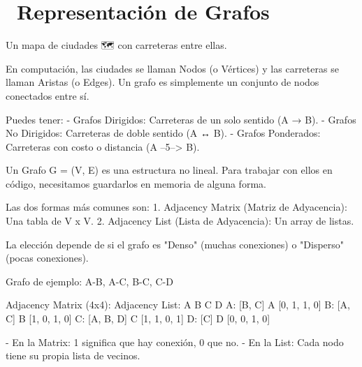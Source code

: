 ﻿\chapter[\emj{🗺️}~Representación de Grafos]{~Representación de Grafos}

\begin{dsaquees}

Un mapa de ciudades 🗺️ con carreteras entre ellas. 

En computación, las ciudades se llaman Nodos (o Vértices) y las 
carreteras se llaman Aristas (o Edges). Un grafo es simplemente un 
conjunto de nodos conectados entre sí. 

Puedes tener:
- Grafos Dirigidos: Carreteras de un solo sentido (A → B).
- Grafos No Dirigidos: Carreteras de doble sentido (A ↔ B).
- Grafos Ponderados: Carreteras con costo o distancia (A --5--> B).

\end{dsaquees}

\begin{dsaotraforma}

Un Grafo G = (V, E) es una estructura no lineal. Para trabajar con 
ellos en código, necesitamos guardarlos en memoria de alguna forma. 

Las dos formas más comunes son:
1. Adjacency Matrix (Matriz de Adyacencia): Una tabla de V x V.
2. Adjacency List (Lista de Adyacencia): Un array de listas.

La elección depende de si el grafo es "Denso" (muchas conexiones) o 
"Disperso" (pocas conexiones).

\end{dsaotraforma}

\begin{dsadiagrama}
Grafo de ejemplo: A-B, A-C, B-C, C-D

Adjacency Matrix (4x4):      Adjacency List:
     A  B  C  D              A: [B, C]
  A [0, 1, 1, 0]             B: [A, C]
  B [1, 0, 1, 0]             C: [A, B, D]
  C [1, 1, 0, 1]             D: [C]
  D [0, 0, 1, 0]

- En la Matrix: 1 significa que hay conexión, 0 que no.
- En la List: Cada nodo tiene su propia lista de vecinos.
\end{dsadiagrama}

